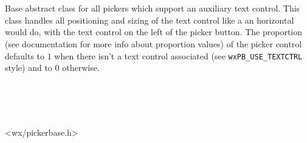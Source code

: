 
\section{}\label{wxpickerbase}

Base abstract class for all pickers which support an auxiliary text control.
This class handles all positioning and sizing of the text control like a
an horizontal  would do, with the text control on
the left of the picker button.
The proportion (see  documentation for more info about
proportion values) of the picker control defaults to $1$ when there isn't a text control
associated (see {\tt wxPB\_USE\_TEXTCTRL} style) and to $0$ otherwise.


\\
\\
\\


<wx/pickerbase.h>


\twocolwidtha{5cm}%
\begin{twocollist}\itemsep=0pt
\end{twocollist}





\label{wxpickerbasesetinternalmargin}


